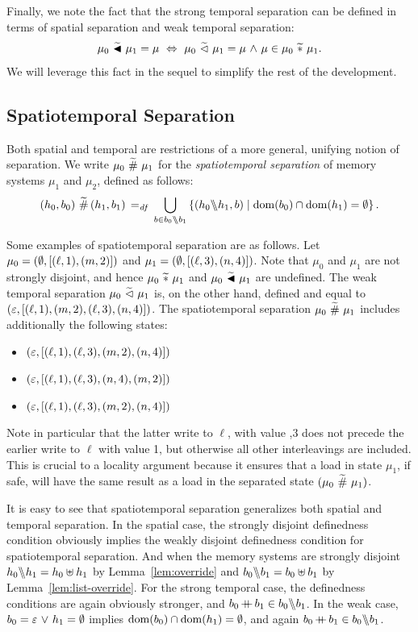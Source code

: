 \documentclass[11pt]{report}
\begin{document}
Finally, we note the fact that the strong temporal separation can be defined in terms of spatial separation and weak temporal separation: \[ \mu_0 \operatorname{\,\widetilde{\blacktriangleleft}\,} \mu_1 = \mu \,\,\Leftrightarrow\,\, \mu_0 \operatorname{\,\widetilde{\vartriangleleft}\,} \mu_1 = \mu \operatorname{\,\wedge\,} \mu \in \mu_0 \operatorname{\,\widetilde{\ast}\,} \mu_1.\] We will leverage this fact in the sequel to simplify the rest of the development. 

\subsection{Spatiotemporal Separation}
\label{sec:sequential-spatiotemporal-separation}

Both spatial and temporal are restrictions of a more general, unifying notion of separation. We write $\mu_0 \operatorname{\,\widetilde{\#}\,} \mu_1$ for the \emph{spatiotemporal separation} of memory systems $\mu_1$ and $\mu_2$, defined as follows: \[ (h_0,b_0) \operatorname{\,\widetilde{\#}\,} (h_1,b_1) \operatorname{\;=_{\mathit{df}}\;} \bigcup_{b \in b_0 \backslash\!\!\backslash b_1} \left\lbrace (h_0 \backslash\!\!\backslash h_1, b) \mid \operatorname{\mathrm{dom}}(b_0) \cap \operatorname{\mathrm{dom}}(h_1) = \operatorname{\emptyset} \right\rbrace.\] 

Some examples of spatiotemporal separation are as follows. Let $\mu_0 = (\operatorname{\emptyset},\left[(\ell,1),(m,2)\right])$ and $\mu_1 = (\operatorname{\emptyset},\left[(\ell,3),(n,4)\right])$. Note that $\mu_0$ and $\mu_1$ are not strongly disjoint, and hence $\mu_0 \operatorname{\,\widetilde{\ast}\,} \mu_1$ and $\mu_0 \operatorname{\,\widetilde{\blacktriangleleft}\,} \mu_1$ are undefined. The weak temporal separation $\mu_0 \operatorname{\,\widetilde{\vartriangleleft}\,} \mu_1$ is, on the other hand, defined and equal to $(\varepsilon,\left[(\ell,1),(m,2),(\ell,3),(n,4)\right])$. The spatiotemporal separation $\mu_0 \operatorname{\,\widetilde{\#}\,} \mu_1$ includes additionally the following states: \begin{itemize} \item $(\varepsilon,\left[(\ell,1),(\ell,3),(m,2),(n,4)\right])$
  \item $(\varepsilon,\left[(\ell,1),(\ell,3),(n,4),(m,2)\right])$
  \item $(\varepsilon,\left[(\ell,1),(\ell,3),(m,2),(n,4)\right])$
\end{itemize} Note in particular that the latter write to $\ell$, with value ,$3$ does not precede the earlier write to $\ell$ with value 1, but otherwise all other interleavings are included. This is crucial to a locality argument because it ensures that a load in state $\mu_1$, if safe, will have the same result as a load in the separated state $(\mu_0 \operatorname{\,\widetilde{\#}\,} \mu_1)$. 

It is easy to see that spatiotemporal separation generalizes both spatial and temporal separation. In the spatial case, the strongly disjoint definedness condition obviously implies the weakly disjoint definedness condition for spatiotemporal separation. And when the memory systems are strongly disjoint $h_0 \backslash\!\!\backslash h_1 = h_0 \uplus h_1$ by Lemma~\ref{lem:override} and $b_0 \backslash\!\!\backslash b_1 = b_0 \uplus b_1$ by Lemma~\ref{lem:list-override}. For the strong temporal case, the definedness conditions are again obviously stronger, and $b_0 \operatorname{+\!\!\!+} b_1 \in b_0 \backslash\!\!\backslash b_1$. In the weak case, $b_0 = \varepsilon \operatorname{\,\vee\,} h_1 = \operatorname{\emptyset}$ implies $\operatorname{\mathrm{dom}}(b_0) \cap \operatorname{\mathrm{dom}}(h_1) = \operatorname{\emptyset}$, and again $b_0 \operatorname{+\!\!\!+} b_1 \in b_0 \backslash\!\!\backslash b_1$. 
\end{document}
